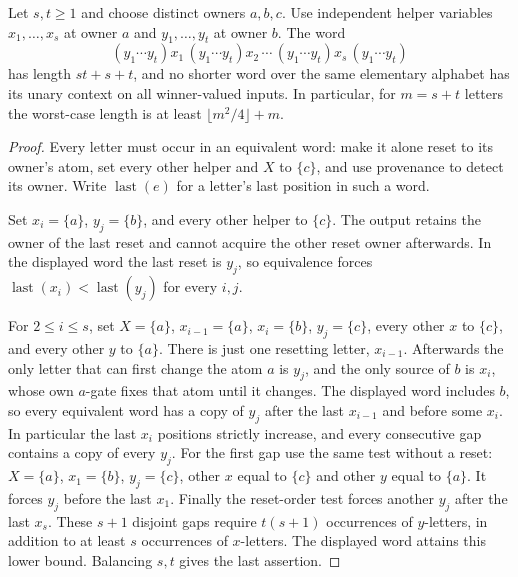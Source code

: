 \begin{proposition}
\label{core:prop:spine-quadratic-alphabet}
Let $s,t\geq1$ and choose distinct owners $a,b,c$.
Use independent helper variables $x_1,\ldots,x_s$ at owner $a$ and
$y_1,\ldots,y_t$ at owner $b$. The word
\[
 (y_1\cdots y_t)x_1\,(y_1\cdots y_t)x_2\,\cdots\,
 (y_1\cdots y_t)x_s\,(y_1\cdots y_t)
\]
has length $st+s+t$, and no shorter word over the same elementary
alphabet has its unary context on all winner-valued inputs.
In particular, for $m=s+t$ letters the worst-case length is at least
$\lfloor m^2/4\rfloor+m$.
\end{proposition}
\begin{proof}
Every letter must occur in an equivalent word: make it alone reset to
its owner's atom, set every other helper and $X$ to $\{c\}$, and use
provenance to detect its owner. Write $\operatorname{last}(e)$ for a
letter's last position in such a word.

Set $x_i=\{a\}$, $y_j=\{b\}$, and every other helper to $\{c\}$.
The output retains the owner of the last reset and cannot acquire the
other reset owner afterwards. In the displayed word the last reset is
$y_j$, so equivalence forces
$\operatorname{last}(x_i)<\operatorname{last}(y_j)$ for every $i,j$.

For $2\leq i\leq s$, set $X=\{a\}$,
$x_{i-1}=\{a\}$, $x_i=\{b\}$, $y_j=\{c\}$, every other $x$ to
$\{c\}$, and every other $y$ to $\{a\}$.
There is just one resetting letter, $x_{i-1}$. Afterwards the only
letter that can first change the atom $a$ is $y_j$, and the only source
of $b$ is $x_i$, whose own $a$-gate fixes that atom until it changes.
The displayed word includes $b$, so every equivalent word has a copy of
$y_j$ after the last $x_{i-1}$ and before some $x_i$.
In particular the last $x_i$ positions strictly increase, and every
consecutive gap contains a copy of every $y_j$.
For the first gap use the same test without a reset: $X=\{a\}$,
$x_1=\{b\}$, $y_j=\{c\}$, other $x$ equal to $\{c\}$ and other $y$
equal to $\{a\}$. It forces $y_j$ before the last $x_1$.
Finally the reset-order test forces another $y_j$ after the last $x_s$.
These $s+1$ disjoint gaps require $t(s+1)$ occurrences of $y$-letters,
in addition to at least $s$ occurrences of $x$-letters.
The displayed word attains this lower bound. Balancing $s,t$ gives the
last assertion.
\end{proof}
